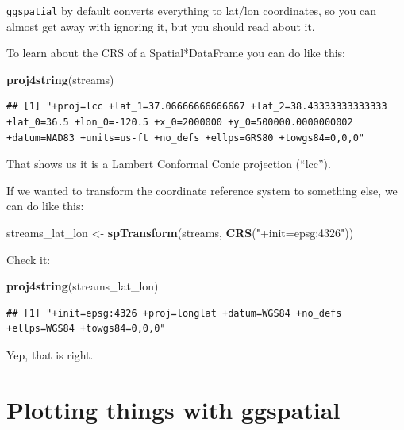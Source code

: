 \documentclass[]{book}
\newenvironment{Shaded}{\begin{snugshade}}{\end{snugshade}}
\newcommand{\KeywordTok}[1]{\textcolor[rgb]{0.13,0.29,0.53}{\textbf{{#1}}}}
\newcommand{\StringTok}[1]{\textcolor[rgb]{0.31,0.60,0.02}{{#1}}}
\newcommand{\NormalTok}[1]{{#1}}
\theoremstyle{definition}
\theoremstyle{definition}
\theoremstyle{remark}
\begin{document}
\texttt{ggspatial} by default converts everything to lat/lon
coordinates, so you can almost get away with ignoring it, but you should
read about it.

To learn about the CRS of a Spatial*DataFrame you can do like this:

\begin{Shaded}
\begin{Highlighting}[]
\KeywordTok{proj4string}\NormalTok{(streams)}
\end{Highlighting}
\end{Shaded}

\begin{verbatim}
## [1] "+proj=lcc +lat_1=37.06666666666667 +lat_2=38.43333333333333 +lat_0=36.5 +lon_0=-120.5 +x_0=2000000 +y_0=500000.0000000002 +datum=NAD83 +units=us-ft +no_defs +ellps=GRS80 +towgs84=0,0,0"
\end{verbatim}

That shows us it is a Lambert Conformal Conic projection (``lcc'').

If we wanted to transform the coordinate reference system to something
else, we can do like this:

\begin{Shaded}
\begin{Highlighting}[]
\NormalTok{streams_lat_lon <-}\StringTok{ }\KeywordTok{spTransform}\NormalTok{(streams, }\KeywordTok{CRS}\NormalTok{(}\StringTok{"+init=epsg:4326"}\NormalTok{))}
\end{Highlighting}
\end{Shaded}

Check it:

\begin{Shaded}
\begin{Highlighting}[]
\KeywordTok{proj4string}\NormalTok{(streams_lat_lon)}
\end{Highlighting}
\end{Shaded}

\begin{verbatim}
## [1] "+init=epsg:4326 +proj=longlat +datum=WGS84 +no_defs +ellps=WGS84 +towgs84=0,0,0"
\end{verbatim}

Yep, that is right.

\section{Plotting things with
ggspatial}\label{plotting-things-with-ggspatial}
\end{document}
